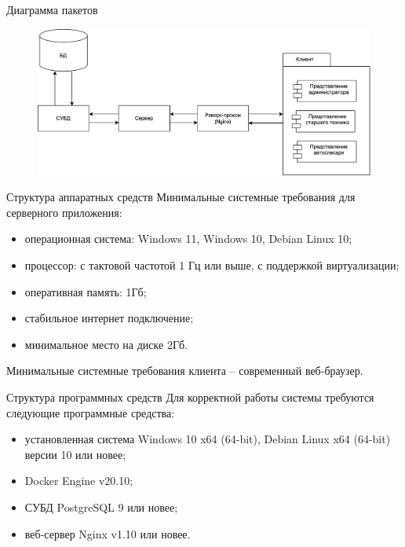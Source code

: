 \documentclass{beamer}
\begin{document}
\begin{frame}
    {Диаграмма пакетов}
    \begin{figure}[H]
        \centering
        \includegraphics[keepaspectratio,width=\textwidth]{presentation/images/modules.png}
    \end{figure}
\end{frame}

\begin{frame}
    {Структура аппаратных средств}
    Минимальные системные требования для серверного приложения:
    \begin{itemize}
        \item операционная система: Windows 11, Windows 10, Debian Linux 10;
        \item процессор: с тактовой частотой 1 Гц или выше, с поддержкой
            виртуализации;
        \item оперативная память: 1Гб;
        \item стабильное интернет подключение;
        \item минимальное место на диске 2Гб.
    \end{itemize}

    Минимальные системные требования клиента -- современный веб-браузер.
\end{frame}

\begin{frame}
    {Структура программных средств}
    Для корректной работы системы требуются следующие программные средства:

    \begin{itemize}
        \item установленная система Windows 10 x64 (64-bit),
            Debian Linux x64 (64-bit) версии 10 или новее;
        \item Docker Engine v20.10;
        \item СУБД PostgreSQL 9 или новее;
        \item веб-сервер Nginx v1.10 или новее.
    \end{itemize}
\end{frame}
\end{document}
